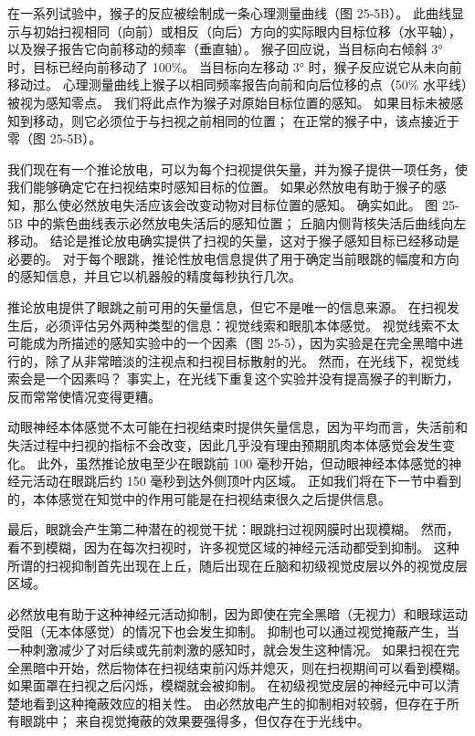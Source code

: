 在一系列试验中，猴子的反应被绘制成一条心理测量曲线（图 25-5B）。 此曲线显示与初始扫视相同（向前）或相反（向后）方向的实际眼内目标位移（水平轴），以及猴子报告它向前移动的频率（垂直轴）。 猴子回应说，当目标向右倾斜 3° 时，目标已经向前移动了 100\%。 当目标向左移动 3° 时，猴子反应说它从未向前移动过。 心理测量曲线上猴子以相同频率报告向前和向后位移的点（50\% 水平线）被视为感知零点。 我们将此点作为猴子对原始目标位置的感知。 如果目标未被感知到移动，则它必须位于与扫视之前相同的位置； 在正常的猴子中，该点接近于零（图 25-5B）。

我们现在有一个推论放电，可以为每个扫视提供矢量，并为猴子提供一项任务，使我们能够确定它在扫视结束时感知目标的位置。 如果必然放电有助于猴子的感知，那么使必然放电失活应该会改变动物对目标位置的感知。 确实如此。 图 25-5B 中的紫色曲线表示必然放电失活后的感知位置； 丘脑内侧背核失活后曲线向左移动。 结论是推论放电确实提供了扫视的矢量，这对于猴子感知目标已经移动是必要的。 对于每个眼跳，推论性放电信息提供了用于确定当前眼跳的幅度和方向的感知信息，并且它以机器般的精度每秒执行几次。

推论放电提供了眼跳之前可用的矢量信息，但它不是唯一的信息来源。 在扫视发生后，必须评估另外两种类型的信息：视觉线索和眼肌本体感觉。 视觉线索不太可能成为所描述的感知实验中的一个因素（图 25-5），因为实验是在完全黑暗中进行的，除了从非常暗淡的注视点和扫视目标散射的光。 然而，在光线下，视觉线索会是一个因素吗？ 事实上，在光线下重复这个实验并没有提高猴子的判断力，反而常常使情况变得更糟。

动眼神经本体感觉不太可能在扫视结束时提供矢量信息，因为平均而言，失活前和失活过程中扫视的指标不会改变，因此几乎没有理由预期肌肉本体感觉会发生变化。 此外，虽然推论放电至少在眼跳前 100 毫秒开始，但动眼神经本体感觉的神经元活动在眼跳后约 150 毫秒到达外侧顶叶内区域。 正如我们将在下一节中看到的，本体感觉在知觉中的作用可能是在扫视结束很久之后提供信息。

最后，眼跳会产生第二种潜在的视觉干扰：眼跳扫过视网膜时出现模糊。 然而，看不到模糊，因为在每次扫视时，许多视觉区域的神经元活动都受到抑制。 这种所谓的扫视抑制首先出现在上丘，随后出现在丘脑和初级视觉皮层以外的视觉皮层区域。

必然放电有助于这种神经元活动抑制，因为即使在完全黑暗（无视力）和眼球运动受阻（无本体感觉）的情况下也会发生抑制。 抑制也可以通过视觉掩蔽产生，当一种刺激减少了对后续或先前刺激的感知时，就会发生这种情况。 如果扫视在完全黑暗中开始，然后物体在扫视结束前闪烁并熄灭，则在扫视期间可以看到模糊。 如果面罩在扫视之后闪烁，模糊就会被抑制。 在初级视觉皮层的神经元中可以清楚地看到这种掩蔽效应的相关性。 由必然放电产生的抑制相对较弱，但存在于所有眼跳中； 来自视觉掩蔽的效果要强得多，但仅存在于光线中。


